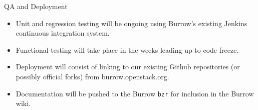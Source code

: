 \documentclass{beamer}
\begin{document}
\begin{frame}{QA and Deployment}
  \begin{itemize}
  \item Unit and regression testing will be ongoing using Burrow's existing Jenkins continuous integration system.
  \item Functional testing will take place in the weeks leading up to code freeze.
  \item Deployment will consist of linking to our existing Github repositories (or possibly official forks)
    from burrow.openstack.org.
  \item Documentation will be pushed to the Burrow \texttt{bzr} for inclusion in the Burrow wiki.
  \end{itemize}
\end{frame}
\end{document}
